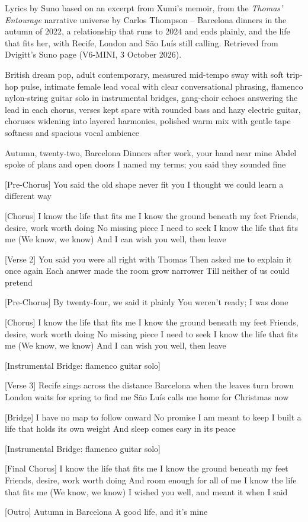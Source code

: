 \begin{notes}
Lyrics by Suno based on an excerpt from Xumi's memoir, from the \emph{Thomas’ Entourage} narrative universe by Carlos Thompson -- Barcelona dinners in the autumn of 2022, a relationship that runs to 2024 and ends plainly, and the life that fits her, with Recife, London and São Luís still calling. Retrieved from Dvigitt's Suno page (V6-MINI, 3 October 2026).
\end{notes}
\begin{style}
British dream pop, adult contemporary, measured mid-tempo sway with soft trip-hop pulse, intimate female lead vocal with clear conversational phrasing, flamenco nylon-string guitar solo in instrumental bridges, gang-choir echoes answering the lead in each chorus, verses kept spare with rounded bass and hazy electric guitar, choruses widening into layered harmonies, polished warm mix with gentle tape softness and spacious vocal ambience
\end{style}
\begin{lyrics}
[Verse 1]
Autumn, twenty-two, Barcelona
Dinners after work, your hand near mine
Abdel spoke of plans and open doors
I named my terms; you said they sounded fine

[Pre-Chorus]
You said the old shape never fit you
I thought we could learn a different way

[Chorus]
I know the life that fits me
I know the ground beneath my feet
Friends, desire, work worth doing
No missing piece I need to seek
I know the life that fits me
(We know, we know)
And I can wish you well, then leave

[Verse 2]
You said you were all right with Thomas
Then asked me to explain it once again
Each answer made the room grow narrower
Till neither of us could pretend

[Pre-Chorus]
By twenty-four, we said it plainly
You weren’t ready; I was done

[Chorus]
I know the life that fits me
I know the ground beneath my feet
Friends, desire, work worth doing
No missing piece I need to seek
I know the life that fits me
(We know, we know)
And I can wish you well, then leave

[Instrumental Bridge: flamenco guitar solo]

[Verse 3]
Recife sings across the distance
Barcelona when the leaves turn brown
London waits for spring to find me
São Luís calls me home for Christmas now

[Bridge]
I have no map to follow onward
No promise I am meant to keep
I built a life that holds its own weight
And sleep comes easy in its peace

[Instrumental Bridge: flamenco guitar solo]

[Final Chorus]
I know the life that fits me
I know the ground beneath my feet
Friends, desire, work worth doing
And room enough for all of me
I know the life that fits me
(We know, we know)
I wished you well, and meant it when I said

[Outro]
Autumn in Barcelona
A good life, and it’s mine
\end{lyrics}

